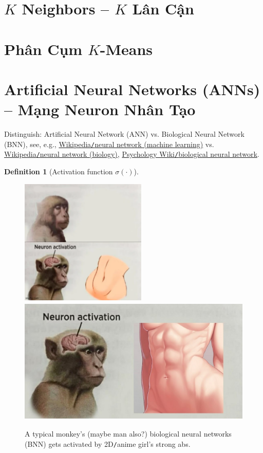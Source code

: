 \documentclass{article}
\newtheorem{definition}{Definition}
\begin{document}

\section{$K$ Neighbors -- $K$ Lân Cận}


\section{Phân Cụm $K$-Means}


\section{Artificial Neural Networks (ANNs) -- Mạng Neuron Nhân Tạo}

Distinguish: Artificial Neural Network (ANN) vs. Biological Neural Network (BNN), see, e.g., \href{https://en.wikipedia.org/wiki/Neural_network_(machine_learning)}{Wikipedia{\tt/}neural network (machine learning)} vs. \href{https://en.wikipedia.org/wiki/Neural_network_(biology)}{Wikipedia{\tt/}neural network (biology)}, \href{https://psychology.fandom.com/wiki/Biological_neural_networks}{Psychology Wiki{\tt/}biological neural network}.

\begin{definition}[Activation function $\sigma(\cdot)$]
	
\end{definition}

\begin{figure}[H]
	\centering
	\includegraphics[height=6cm]{neuron_activation_anime}\includegraphics[height=6cm]{neuron_activation}
	\caption{A typical monkey's (maybe man also?) biological neural networks (BNN) gets activated by 2D{\tt/}anime girl's strong abs.}
\end{figure}
\end{document}

